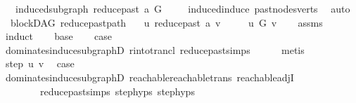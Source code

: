 \begin{isabellebody}
\ \ \ {\isachardoublequoteopen}induced{\isacharunderscore}{\kern0pt}subgraph\ {\isacharparenleft}{\kern0pt}reduce{\isacharunderscore}{\kern0pt}past\ a{\isacharparenright}{\kern0pt}\ G{\isachardoublequoteclose}\isanewline
%
\isadelimproof
\ \ %
\endisadelimproof
%
\isatagproof
{}\isamarkupfalse%
\ \ induced{\isacharunderscore}{\kern0pt}induce\ past{\isacharunderscore}{\kern0pt}nodes{\isacharunderscore}{\kern0pt}verts\ \isamarkupfalse%
\ auto%
\endisatagproof
{\isafoldproof}%
%
\isadelimproof
\isanewline
%
\endisadelimproof
\isanewline
{}\isamarkupfalse%
\ {\isacharparenleft}{\kern0pt}\ blockDAG{\isacharparenright}{\kern0pt}\ reduce{\isacharunderscore}{\kern0pt}past{\isacharunderscore}{\kern0pt}path{\isacharcolon}{\kern0pt}\isanewline
\ \ \ {\isachardoublequoteopen}u\ {\isasymrightarrow}\isactrlsup {\isacharplus}{\kern0pt}\isactrlbsub reduce{\isacharunderscore}{\kern0pt}past\ a\isactrlesub \ v{\isachardoublequoteclose}\ \isanewline
\ \ \ {\isachardoublequoteopen}\ u\ {\isasymrightarrow}\isactrlsup {\isacharplus}{\kern0pt}\isactrlbsub G\isactrlesub \ v{\isachardoublequoteclose}\isanewline
%
\isadelimproof
\ \ %
\endisadelimproof
%
\isatagproof
{}\isamarkupfalse%
\ assms\isanewline
{}\isamarkupfalse%
\ induct\isanewline
\ \ \isamarkupfalse%
\ base\ \isamarkupfalse%
\ \isamarkupfalse%
\ {\isacharquery}{\kern0pt}case\isanewline
\ \ \ \ \isamarkupfalse%
\ dominates{\isacharunderscore}{\kern0pt}induce{\isacharunderscore}{\kern0pt}subgraphD\ r{\isacharunderscore}{\kern0pt}into{\isacharunderscore}{\kern0pt}trancl{\isacharprime}{\kern0pt}\ reduce{\isacharunderscore}{\kern0pt}past{\isachardot}{\kern0pt}simps\isanewline
\ \ \ \ \isamarkupfalse%
\ metis\isanewline
{}\isamarkupfalse%
\ \isamarkupfalse%
\ {\isacharparenleft}{\kern0pt}step\ u\ v{\isacharparenright}{\kern0pt}\ \isamarkupfalse%
\ {\isacharquery}{\kern0pt}case\isanewline
\ \ \ \ \isamarkupfalse%
\ dominates{\isacharunderscore}{\kern0pt}induce{\isacharunderscore}{\kern0pt}subgraphD\ reachable{}{\isacharunderscore}{\kern0pt}reachable{\isacharunderscore}{\kern0pt}trans\ reachable{\isacharunderscore}{\kern0pt}adjI\ \isanewline
\ \ \ \ \ \ \ \ reduce{\isacharunderscore}{\kern0pt}past{\isachardot}{\kern0pt}simps\ step{\isachardot}{\kern0pt}hyps{\isacharparenleft}{\kern0pt}{}{\isacharparenright}{\kern0pt}\ step{\isachardot}{\kern0pt}hyps{\isacharparenleft}{\kern0pt}{}{\isacharparenright}{\kern0pt}\ \isamarkupfalse%

\end{isabellebody}
